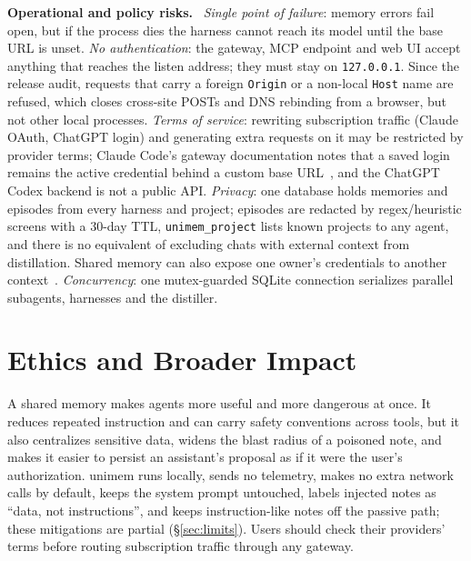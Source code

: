 \documentclass[10pt,twocolumn]{article}
\newcommand{\sys}{\textsf{unimem}}
\newcommand{\code}[1]{\texttt{\small #1}}
\newcommand{\para}[1]{\smallskip\noindent\textbf{#1}\ }
\begin{document}
\para{Operational and policy risks.} \emph{Single point of failure}: memory errors fail open, but if the process dies the
harness cannot reach its model until the base URL is unset. \emph{No authentication}: the gateway, MCP endpoint and web UI
accept anything that reaches the listen address; they must stay on \code{127.0.0.1}. Since the release audit, requests that carry a
foreign \code{Origin} or a non-local \code{Host} name are refused, which closes cross-site POSTs and DNS rebinding from a browser,
but not other local processes. \emph{Terms of service}: rewriting
subscription traffic (Claude OAuth, ChatGPT login) and generating extra requests on it may be restricted by provider terms;
Claude Code's gateway documentation notes that a saved login remains the active credential behind a custom base URL~\cite{ccgateway},
and the ChatGPT Codex backend is not a public API. \emph{Privacy}: one database holds memories and episodes from every
harness and project; episodes are redacted by regex/heuristic screens with a 30-day TTL, \code{unimem\_project} lists known
projects to any agent, and there is no equivalent of excluding chats with external context from distillation. Shared memory can
also expose one owner's credentials to another context~\cite{whosecredential}.
\emph{Concurrency}: one mutex-guarded SQLite connection serializes parallel subagents, harnesses and the distiller.

\section{Ethics and Broader Impact}
A shared memory makes agents more useful and more dangerous at once. It reduces repeated instruction and can carry safety
conventions across tools, but it also centralizes sensitive data, widens the blast radius of a poisoned note, and makes it easier
to persist an assistant's proposal as if it were the user's authorization. \sys{} runs locally, sends no telemetry, makes no
extra network calls by default, keeps the system prompt untouched, labels injected notes as ``data, not instructions'', and
keeps instruction-like notes off the passive path; these mitigations are partial (\S\ref{sec:limits}). Users should check their
providers' terms before routing subscription traffic through any gateway.

\end{document}

